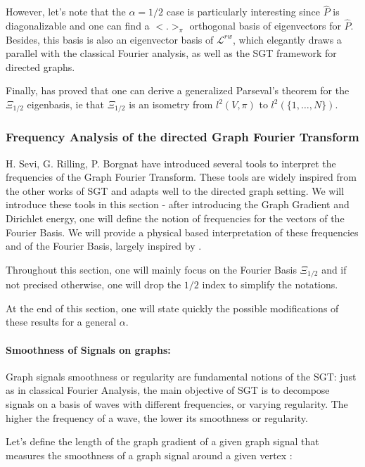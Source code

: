\documentclass[sn-mathphys]{sn-jnl}%
\theoremstyle{thmstyleone}%
\theoremstyle{thmstyletwo}%
\theoremstyle{thmstylethree}%
\begin{document}
However, let's note that the $\alpha = 1/2$ case is particularly
interesting since $\hat{P}$ is diagonalizable and one can find a
$<.>_{\pi}$ orthogonal basis of eigenvectors for $\hat{P}$. Besides,
this basis is also an eigenvector basis of $\mathcal{L}^{rw}$, which
elegantly draws a parallel with the classical Fourier analysis, as
well as the SGT framework for directed graphs.

Finally, \cite{sevi2019} has proved that one can derive a generalized
Parseval's theorem for the $\Xi_{1/2}$ eigenbasis, ie that $\Xi_{1/2}$
is an isometry from $l^2(V, \pi)$ to $l^2(\{1, \hdots, N \})$.

\subsubsection{Frequency Analysis of the directed Graph Fourier Transform}

H. Sevi, G. Rilling, P. Borgnat \cite{sevi2019} have introduced
several tools to interpret the frequencies of the Graph Fourier
Transform. These tools are widely inspired from the other works of SGT
and adapts well to the directed graph setting. We will introduce these
tools in this section - after introducing the Graph Gradient and
Dirichlet energy, one will define the notion of frequencies for the
vectors of the Fourier Basis. We will provide a physical based
interpretation of these frequencies and of the Fourier Basis, largely
inspired by \cite{sevi2019}.

Throughout this section, one will mainly focus on the Fourier Basis
$\Xi_{1/2}$ and if not precised otherwise, one will drop the $1/2$
index to simplify the notations.

At the end of this section, one will state quickly the possible
modifications of these results for a general $\alpha$.

\paragraph{Smoothness of Signals on graphs:}
Graph signals smoothness or regularity are fundamental notions of the
SGT: just as in classical Fourier Analysis, the main objective of SGT
is to decompose signals on a basis of waves with different
frequencies, or varying regularity. The higher the frequency of a
wave, the lower its smoothness or regularity.

Let's define the length of the graph gradient of a given graph signal
that measures the smoothness of a graph signal around a given vertex :
\end{document}
